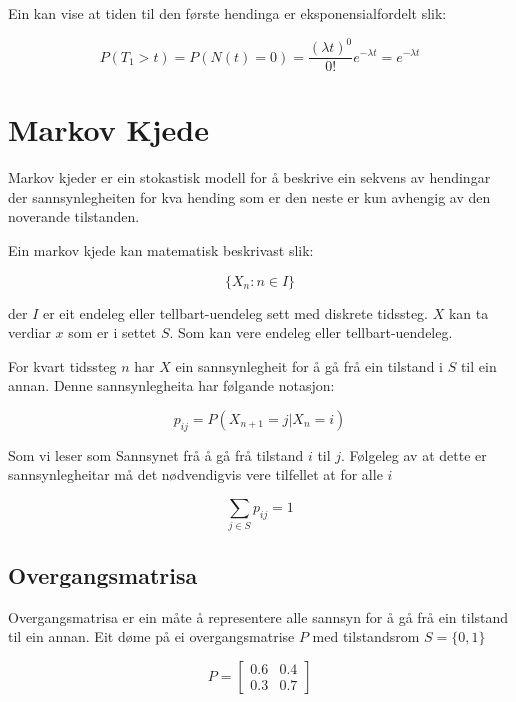 Ein kan vise at tiden til den første hendinga er eksponensialfordelt slik:

\begin{equation}
    P(T_1 > t) = P(N(t) = 0) = \frac{(\lambda t)^0}{0!}e^{-\lambda t} = e^{-\lambda t}
\end{equation}

\section{Markov Kjede}
Markov kjeder er ein stokastisk modell for å beskrive ein sekvens av hendingar der sannsynlegheiten for kva hending som er den neste er kun avhengig av den noverande tilstanden. 

Ein markov kjede kan matematisk beskrivast slik:

\begin{equation}
    \{X_n : n \in I\}
\end{equation}

der $I$ er eit endeleg eller tellbart-uendeleg sett med diskrete tidssteg. $X$ kan ta verdiar $x$ som er i settet $S$. Som kan vere endeleg eller tellbart-uendeleg.

For kvart tidssteg $n$ har $X$ ein sannsynlegheit for å gå frå ein tilstand i $S$ til ein annan. Denne sannsynlegheita har følgande notasjon:

\begin{equation}
    p_{ij} = P(X_{n+1} = j | X_n = i)
\end{equation}

Som vi leser som \startsitat Sannsynet frå å gå frå tilstand $i$ til $j$\sluttsitat. Følgeleg av at dette er sannsynlegheitar må det nødvendigvis vere tilfellet at for alle $i$

\begin{equation}
    \sum_{j \in S} p_{ij} = 1
\end{equation}

\subsection{Overgangsmatrisa}
Overgangsmatrisa er ein måte å representere alle sannsyn for å gå frå ein tilstand til ein annan. Eit døme på ei overgangsmatrise $P$ med tilstandsrom $S = \{0, 1\}$

\begin{equation}
    P = 
    \begin{bmatrix}
        0.6 & 0.4 \\
        0.3 & 0.7
    \end{bmatrix}
\end{equation}

